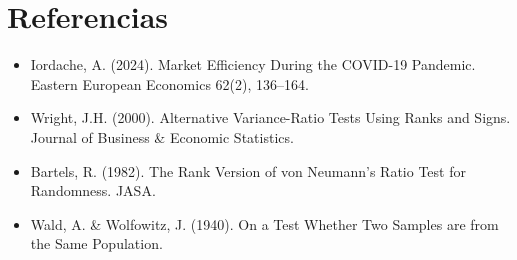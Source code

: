 \documentclass[12pt]{article}
\begin{document}
\section*{Referencias}
\begin{itemize}
  \item Iordache, A. (2024). Market Efficiency During the COVID-19 Pandemic. Eastern European Economics 62(2), 136–164.
  \item Wright, J.H. (2000). Alternative Variance-Ratio Tests Using Ranks and Signs. Journal of Business \& Economic Statistics.
  \item Bartels, R. (1982). The Rank Version of von Neumann’s Ratio Test for Randomness. JASA.
  \item Wald, A. \& Wolfowitz, J. (1940). On a Test Whether Two Samples are from the Same Population.
\end{itemize}
\end{document}
